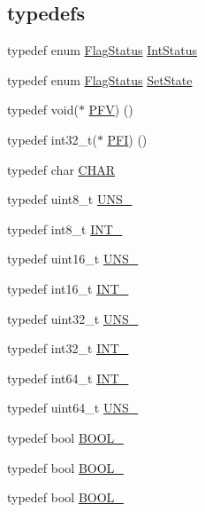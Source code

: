 \subsection*{\textquotesingle{}typedefs\textquotesingle{}}
\begin{DoxyCompactItemize}
\item 
typedef enum \hyperlink{group___l_p_c___types___public___types_ga89136caac2e14c55151f527ac02daaff}{Flag\+Status} \hyperlink{group___l_p_c___types___public___types_gab7d263072f745b4f3913fb0afc434c4e}{Int\+Status}
\item 
typedef enum \hyperlink{group___l_p_c___types___public___types_ga89136caac2e14c55151f527ac02daaff}{Flag\+Status} \hyperlink{group___l_p_c___types___public___types_ga7fab312a9f10f1386a955977d2ec96fe}{Set\+State}
\item 
typedef void($\ast$ \hyperlink{group___l_p_c___types___public___types_ga5f7b826e88ffb1fae2260abb3a75b19a}{P\+FV}) ()
\item 
typedef int32\+\_\+t($\ast$ \hyperlink{group___l_p_c___types___public___types_ga5cad251913e41ad7a8c765945356ec47}{P\+FI}) ()
\item 
typedef char \hyperlink{group___l_p_c___types___public___types_gaebb9e13210d88d43e32e735ada43a425}{C\+H\+AR}
\item 
typedef uint8\+\_\+t \hyperlink{group___l_p_c___types___public___types_ga7353117656180c64d2216c874998b98b}{U\+N\+S\+\_}
\item 
typedef int8\+\_\+t \hyperlink{group___l_p_c___types___public___types_gac172005ce53b001f50a677cc10bd17b0}{I\+N\+T\+\_}
\item 
typedef uint16\+\_\+t \hyperlink{group___l_p_c___types___public___types_gafce87a7f2271b2cf38d7532f157f8a50}{U\+N\+S\+\_}
\item 
typedef int16\+\_\+t \hyperlink{group___l_p_c___types___public___types_gaae6e34a91bf60db05de64de7720df9a5}{I\+N\+T\+\_}
\item 
typedef uint32\+\_\+t \hyperlink{group___l_p_c___types___public___types_ga28adf5c6b1811ca447826319598d8aba}{U\+N\+S\+\_}
\item 
typedef int32\+\_\+t \hyperlink{group___l_p_c___types___public___types_ga3a17614f3a1b67eaf20781d8ec16a652}{I\+N\+T\+\_}
\item 
typedef int64\+\_\+t \hyperlink{group___l_p_c___types___public___types_ga1a0aab29eee6b306564084e005fa5750}{I\+N\+T\+\_}
\item 
typedef uint64\+\_\+t \hyperlink{group___l_p_c___types___public___types_ga2299199b92f0535ad8c2e2d8c7c7f09b}{U\+N\+S\+\_}
\item 
typedef bool \hyperlink{group___l_p_c___types___public___types_gab02ba567b91b6b3d3c0c0209b2f577a0}{B\+O\+O\+L\+\_}
\item 
typedef bool \hyperlink{group___l_p_c___types___public___types_ga586a49bf86982ab05295515d1e4e35fe}{B\+O\+O\+L\+\_}
\item 
typedef bool \hyperlink{group___l_p_c___types___public___types_ga7cc7a8cc54a0a73fbfcc1eb0b792148d}{B\+O\+O\+L\+\_}
\end{DoxyCompactItemize}
